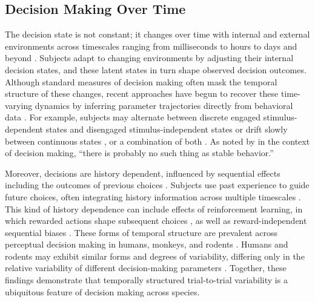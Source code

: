 \documentclass[00-main.tex]{subfiles}
\begin{document}
\subsection{Decision Making Over Time}
The decision state is not constant; it changes over time with internal and external environments across timescales ranging from milliseconds to hours to days and beyond \citep{duffy_disentangling_2025, urai_choice_2019, cochrane_multiple_2023, shevinsky_interaction_2019, schumacher_neural_2023, schumacher_validation_2025}. Subjects adapt to changing environments by adjusting their internal decision states, and these latent states in turn shape observed decision outcomes. Although standard measures of decision making often mask the temporal structure of these changes, recent approaches have begun to recover these time-varying dynamics by inferring parameter trajectories directly from behavioral data \citep{ashwood_mice_2022, gunawan_time-evolving_2022, kucharsky_hidden_2021, maggi_tracking_2024, alister_diffusion_2026}. For example, subjects may alternate between discrete engaged stimulus-dependent states and disengaged stimulus-independent states \citep{ashwood_mice_2022, mohammadi_identifying_2025, duffy_disentangling_2025, senne_state-dependent_2025} or drift slowly between continuous states \citep{vloeberghs_bayesian_2025, roy_extracting_2021, roy_efficient_2018}, or a combination of both \citep{schumacher_neural_2023, schumacher_validation_2025}. As noted by \citet{urai_structure_2025} in the context of decision making, ``there is probably no such thing as stable behavior.''

Moreover, decisions are history dependent, influenced by sequential effects including the outcomes of previous choices \citep{frund_quantifying_2014, gao_sequential_2009}. Subjects use past experience to guide future choices, often integrating history information across multiple timescales \citep{danskin_exponential_2023, nguyen_optimizing_2019, busse_detection_2011, miletic_explaining_2025}. This kind of history dependence can include effects of reinforcement learning, in which rewarded actions shape subsequent choices \citep{pedersen_drift_2017, fontanesi_reinforcement_2019, fengler_beyond_2022}, as well as reward-independent sequential biases \citep{frund_quantifying_2014, gao_sequential_2009}. These forms of temporal structure are prevalent across perceptual decision making in humans, monkeys, and rodents \citep{urai_choice_2019, busse_detection_2011, trevino_response_2022, braun_adaptive_2018, gupta_trial-history_2024}. Humans and rodents may exhibit similar forms and degrees of variability, differing only in the relative variability of different decision-making parameters \citep{nguyen_different_2022, shevinsky_interaction_2019}. Together, these findings demonstrate that temporally structured trial-to-trial variability is a ubiquitous feature of decision making across species.
\end{document}
